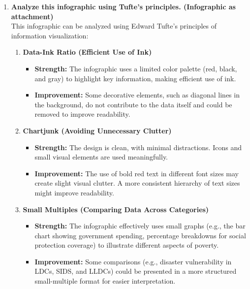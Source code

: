 \documentclass[11pt,a4paper,titlepage]{article}
\begin{document}
\begin{enumerate}
\begin{enumerate}
\begin{enumerate}
\begin{enumerate}
\end{enumerate}

    \item \textbf{Analyze this infographic using Tufte's principles. (Infographic as attachment)} \\
    This infographic can be analyzed using Edward Tufte's principles of information visualization:
    \begin{enumerate}
        \item \textbf{Data-Ink Ratio (Efficient Use of Ink)}
        \begin{itemize}
            \item \textbf{Strength:} The infographic uses a limited color palette (red, black, and gray) to highlight key information, making efficient use of ink.
            \item \textbf{Improvement:} Some decorative elements, such as diagonal lines in the background, do not contribute to the data itself and could be removed to improve readability.
        \end{itemize}
        
        \item \textbf{Chartjunk (Avoiding Unnecessary Clutter)}
        \begin{itemize}
            \item \textbf{Strength:} The design is clean, with minimal distractions. Icons and small visual elements are used meaningfully.
            \item \textbf{Improvement:} The use of bold red text in different font sizes may create slight visual clutter. A more consistent hierarchy of text sizes might improve readability.
        \end{itemize}

        \item \textbf{Small Multiples (Comparing Data Across Categories)}
        \begin{itemize}
            \item \textbf{Strength:} The infographic effectively uses small graphs (e.g., the bar chart showing government spending, percentage breakdowns for social protection coverage) to illustrate different aspects of poverty.
            \item \textbf{Improvement:} Some comparisons (e.g., disaster vulnerability in LDCs, SIDS, and LLDCs) could be presented in a more structured small-multiple format for easier interpretation.
        \end{itemize}


\end{enumerate}
\end{enumerate}
\end{enumerate}
\end{enumerate}
\end{document}
